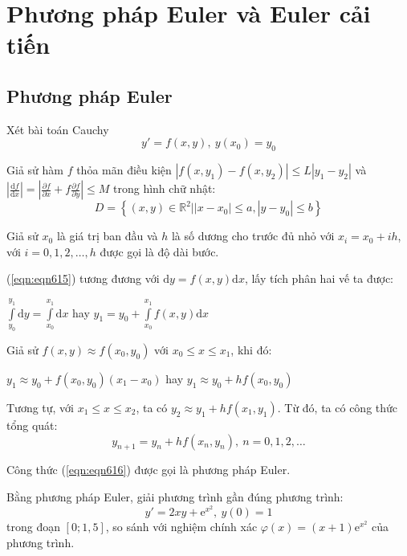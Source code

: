 \section{Phương pháp Euler và Euler cải tiến}
\subsection{Phương pháp Euler}

Xét bài toán Cauchy
\begin{equation}\label{eqn:eqn615}
	y'=f(x,y),~y(x_0)=y_0
\end{equation}

Giả sử hàm $f$ thỏa mãn điều kiện $|f(x,y_1)-f(x,y_2)|\leqslant L|{y_1}-{y_2}|$
và $\left|\frac{\mathrm{d}f}{\mathrm{d}x}\right|=\left|\frac{\partial f}{\partial x}+f\frac{\partial f}{\partial y}\right|\leqslant M$ trong hình chữ nhật:
$$D=\left\{(x,y)\in\mathbb{R}^2\Big||x-x_0|\leqslant a,|y-y_0|\leqslant b\right\}$$

Giả sử $x_0$ là giá trị ban đầu và $h$ là số dương cho trước đủ nhỏ với $x_i=x_0+ih$, với $i=0,1,2,\ldots,h$ được gọi là độ dài bước.\par
(\ref{eqn:eqn615}) tương đương với $\mathrm{d}y=f\left(x,y\right)\mathrm{d}x$, lấy tích phân hai vế ta được:
\begin{center}
	$\int\limits_{y_0}^{y_1}\mathrm{d}y=\int\limits_{x_0}^{x_1}\mathrm{d}x$ hay $y_1=y_0+\int\limits_{x_0}^{x_1} f(x,y)\mathrm{d}x$
\end{center}

Giả sử $f(x,y)\approx f\left(x_0,y_0\right)$ với $x_0\leqslant x\leqslant x_1$, khi đó:
\begin{center}
$y_1\approx y_0+f\left(x_0,y_0\right)\left(x_1-x_0\right)$ hay $y_1\approx y_0+hf\left(x_0,y_0\right)$
\end{center}

Tương tự, với $x_1\leqslant x\leqslant x_2$, ta có $y_2\approx y_1+hf\left(x_1,y_1\right)$.
Từ đó, ta có công thức tổng quát:\\
\begin{equation}\label{eqn:eqn616}
	y_{n+1}=y_n+hf\left(x_n,y_n\right),~n=0, 1, 2, \ldots
\end{equation}

Công thức (\ref{eqn:eqn616}) được gọi là phương pháp Euler.\\

\begin{example}
	Bằng phương pháp Euler, giải phương trình gần đúng phương trình:
	$$y'=2xy+\mathrm{e}^{x^2},~y(0)=1$$
	trong đoạn $[0;1,5]$, so sánh với nghiệm chính xác $\varphi(x)=(x+1)\mathrm{e}^{x^2}$ của phương trình.\par
\end{example}

